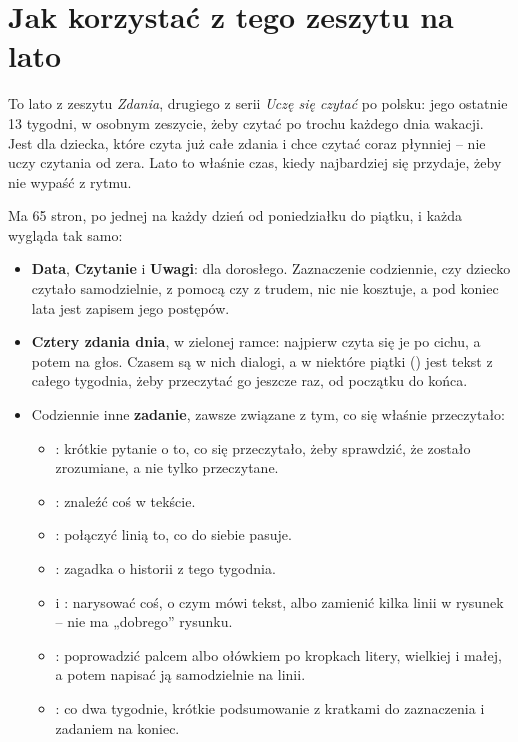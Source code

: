 \section*{Jak korzystać z tego zeszytu na lato}

To lato z zeszytu \emph{Zdania}, drugiego z serii \emph{Uczę się czytać}
po polsku: jego ostatnie 13 tygodni, w osobnym zeszycie, żeby czytać po
trochu każdego dnia wakacji. Jest dla dziecka, które czyta już całe
zdania i chce czytać coraz płynniej -- nie uczy czytania od zera. Lato
to właśnie czas, kiedy najbardziej się przydaje, żeby nie wypaść z
rytmu.

Ma 65 stron, po jednej na każdy dzień od poniedziałku do piątku, i
każda wygląda tak samo:

\begin{itemize}[leftmargin=6mm]
\item \textbf{Data}, \textbf{Czytanie} i \textbf{Uwagi}: dla dorosłego.
  Zaznaczenie codziennie, czy dziecko czytało samodzielnie, z pomocą czy
  z trudem, nic nie kosztuje, a pod koniec lata jest zapisem jego
  postępów.
\item \textbf{Cztery zdania dnia}, w zielonej ramce: najpierw czyta się
  je po cichu, a potem na głos. Czasem są w nich dialogi, a w niektóre
  piątki (\textbf{\lblRelee}) jest tekst z całego tygodnia, żeby
  przeczytać go jeszcze raz, od początku do końca.
\item Codziennie inne \textbf{zadanie}, zawsze związane z tym, co się
  właśnie przeczytało:
  \begin{itemize}[leftmargin=6mm]
  \item \textbf{\lblResponde}: krótkie pytanie o to, co się przeczytało,
    żeby sprawdzić, że zostało zrozumiane, a nie tylko przeczytane.
  \item \textbf{\lblBusca}: znaleźć coś w tekście.
  \item \textbf{\lblRelaciona}: połączyć linią to, co do siebie pasuje.
  \item \textbf{\lblAdivina}: zagadka o historii z tego tygodnia.
  \item \textbf{\lblDibuja} i \textbf{\lblCompleta}: narysować coś, o
    czym mówi tekst, albo zamienić kilka linii w rysunek -- nie ma
    „dobrego” rysunku.
  \item \textbf{\lblTraza}: poprowadzić palcem albo ołówkiem po kropkach
    litery, wielkiej i małej, a potem napisać ją samodzielnie na linii.
  \item \textbf{\lblRepasa}: co dwa tygodnie, krótkie podsumowanie z
    kratkami do zaznaczenia i zadaniem na koniec.
  \end{itemize}
\end{itemize}


